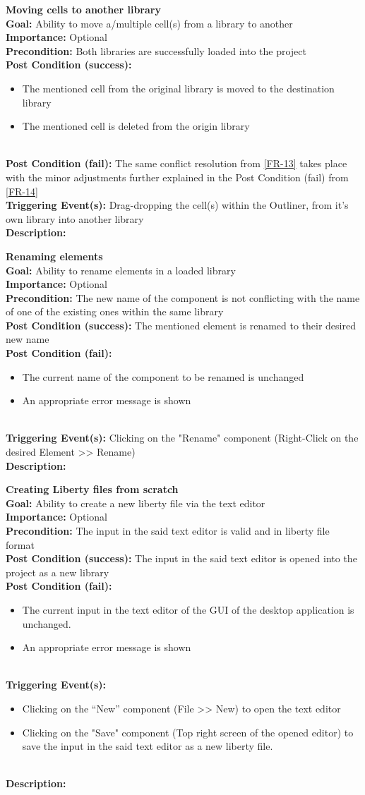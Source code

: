 \documentclass[10pt,a4paper]{report}
\newcommand{\precondition}[1]{
    \textbf{Precondition: } #1 \leavevmode \\
}
\newcommand{\FRDescription}[8]{
    \textbf{#1} \leavevmode \\
    \textbf{Goal: } #2 \leavevmode \\
    \textbf{Importance: } #3 \leavevmode \\
    \precondition{#4}
    \textbf{Post Condition (success): } #5 \leavevmode \\
    \textbf{Post Condition (fail): } #6 \leavevmode \\
    \textbf{Triggering Event(s): } #7 \leavevmode \\
    \textbf{Description: } \leavevmode \\ 
    #8}
\newcommand{\FRODescription}[8]{
    \textbf{#1} \leavevmode \\
    \textbf{Goal: } #2 \leavevmode \\
    \textbf{Importance: } #3 \leavevmode \\
    \precondition{#4}
    \textbf{Post Condition (success): } #5 \leavevmode \\
    \textbf{Post Condition (fail): } #6 \leavevmode \\
    \textbf{Triggering Event(s): } #7 \leavevmode \\
    \textbf{Description: } \leavevmode \\
    #8}
\begin{document}
\begin{FRO}
    \item \FRDescription{Moving cells to another library}
    {Ability to move a/multiple cell(s) from a library to another}
    {Optional}
    {Both libraries are successfully loaded into the project}
    {\begin{itemize}
        \item The mentioned cell from the original library is moved to the destination library
        \item The mentioned cell is deleted from the origin library
    \end{itemize}}
    {The same conflict resolution from \ref{FR-13} takes place with the minor adjustments further explained in the Post Condition (fail) from \ref{FR-14}}
    {Drag-dropping the cell(s) within the Outliner, from it's own library into another library}
    \item \FRODescription{Renaming elements}
    {Ability to rename elements in a loaded library}
    {Optional}
    {The new name of the component is not conflicting with the name of one of the existing ones within the same library}
    {The mentioned element is renamed to their desired new name}
    {\begin{itemize}
        \item The current name of the component to be renamed is unchanged
        \item An appropriate error message is shown
    \end{itemize}}
    {Clicking on the "Rename" component (Right-Click on the desired Element  >> Rename)}
    \item \FRODescription{Creating Liberty files from scratch}
    {Ability to create a new liberty file via the text editor}
    {Optional}
    {The input in the said text editor is valid and in liberty file format}
    {The input in the said text editor is opened into the project as a new library}
    {\begin{itemize}
        \item The current input in the text editor of the GUI of the desktop application is unchanged.
        \item An appropriate error message is shown
    \end{itemize}}
    {\begin{itemize}
        \item Clicking on the “New” component (File >> New) to open the text editor
        \item Clicking on the "Save" component (Top right screen of the opened editor) to save the input in the said text editor as a new liberty file.

\end{itemize}}
\end{FRO}
\end{document}
